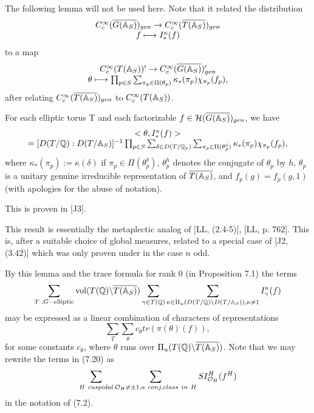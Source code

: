 The following lemma will not be used here. Note that it related
the distribution
\[
\begin{array}{c}
C_c^\infty(\overline{G(\mathbb{A} _S)})_{gen}
\rightarrow
C_c^\infty(\overline{T(\mathbb{A} _S)})_{gen}\\
f\longmapsto I_*^\kappa(f)
\end{array}
\]
to a map
\[
\begin{array}{c}
C_c^\infty(T(\mathbb{A} _S))'
\rightarrow
C_c^\infty(\overline{G(\mathbb{A} _S)})'_{gen}\\
\theta \longmapsto
\prod_{p\in S}\sum_{\pi _p\in \Pi (\theta_p)}
\kappa _{*}(\pi _p)\chi _{\pi _p}(f_p),
\end{array}
\]
after relating $C_c^\infty(\overline{T(\mathbb{A} _S)})_{gen}$
to $C_c^\infty(T(\mathbb{A} _S))$.
\begin{lemma}
For each elliptic torus T and each factorizable
$f\in {\cal{H}}(\overline{G(\mathbb{A} _S)})_{gen}$, we have 
\[
\begin{array}{c}
<\theta ,I_{*}^\kappa (f )> \\ 
=[D(T/\mathbb{Q} ):D(T/\mathbb{A} _S)]^{-1}
\prod_{p\in S}
\sum_{\delta\in D(T/{\Bbb Q}_p)}
\sum_{\pi _p\in \Pi (\theta_p^\delta)}
\kappa _{*}(\pi _p)\chi _{\pi _p}(f_p),
\end{array}
\]
where $\kappa _{*}(\pi _p):=\kappa (\delta)$ if
$\pi _p\in \Pi (\theta_p^\delta)$,
${\theta }_p^h$ denotes the conjugate of ${\theta }_p$ by $h$,
${\theta }_p$ is a unitary genuine irreducible
representation of $\overline{T(\mathbb{A} _S)}$, and
$f_p(g)=f_p(g,1)$ (with apologies for the abuse of
notation).
\end{lemma}

This is proven in [J3].
\begin{remark}
This result is essentially the metaplectic analog of
[LL, (2.4-5)], [LL, p. 762]. This is, after a suitable 
choice of global measures, related to a special case of
[J2, (3.42)] which was only proven under in the case $n$ odd.
\end{remark}

By this lemma and the trace formula for rank 0 (in
Proposition 7.1)
the terms 
\begin{equation}
\sum_{ T \; , G-\mathrm{elliptic} }
{\rm vol}(T(\mathbb{Q} )\backslash \overline{T(\mathbb{A} _S)})
\sum_{\gamma \in T(\mathbb{Q} )}
\sum_{ \kappa \in \Pi _u(D(T/{\Bbb Q})\backslash D(T/\mathbb{A} _S)),
 \kappa \neq 1}
I_\gamma ^\kappa (f)
\end{equation}
may be expressed as a linear combination of characters of representations 
\begin{equation}
\sum_T
\sum_\theta c_\theta tr(\pi (\theta )(f)),
\end{equation}
for some constants $c_\theta$, where $\theta$ runs over
$\Pi_u(T(\mathbb{Q} )\backslash \overline{T(\mathbb{A} _S)})$.
Note that we may rewrite the terms in (7.20) as
\[
\sum_{H\ cuspidal}
\sum_{ {\cal O}_H\not= \pm 1,
a\ conj,
class\ in\ H}
SI_{{\cal O}_H}^H(f^H)
\]
in the notation of (7.2).


